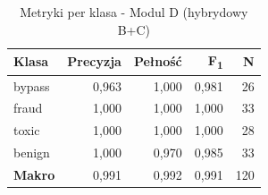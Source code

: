 
\begin{table}[H]
\centering
\caption{Metryki per klasa - Modul D (hybrydowy B+C)}
\label{tab:hybrid-metrics}
\renewcommand{\arraystretch}{1.2}
\begin{tabular}{lrrrr}
\hline
\textbf{Klasa} & \textbf{Precyzja} & \textbf{Pełność} & \textbf{F\textsubscript{1}} & \textbf{N} \\
\hline
bypass & 0{,}963 & 1{,}000 & 0{,}981 & 26 \\
fraud & 1{,}000 & 1{,}000 & 1{,}000 & 33 \\
toxic & 1{,}000 & 1{,}000 & 1{,}000 & 28 \\
benign & 1{,}000 & 0{,}970 & 0{,}985 & 33 \\
\hline
\textbf{Makro} & 0{,}991 & 0{,}992 & 0{,}991 & 120 \\
\hline
\end{tabular}
\end{table}
